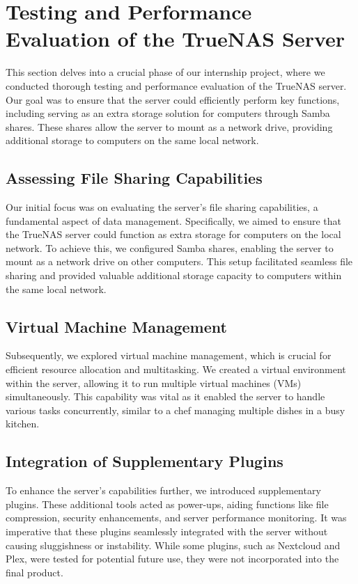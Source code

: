 \section{Testing and Performance Evaluation of the TrueNAS Server}

This section delves into a crucial phase of our internship project, where we conducted thorough testing and performance evaluation of the TrueNAS server. Our goal was to ensure that the server could efficiently perform key functions, including serving as an extra storage solution for computers through Samba shares. These shares allow the server to mount as a network drive, providing additional storage to computers on the same local network.

\subsection{Assessing File Sharing Capabilities}

Our initial focus was on evaluating the server's file sharing capabilities, a fundamental aspect of data management. Specifically, we aimed to ensure that the TrueNAS server could function as extra storage for computers on the local network. To achieve this, we configured Samba shares, enabling the server to mount as a network drive on other computers. This setup facilitated seamless file sharing and provided valuable additional storage capacity to computers within the same local network.

\subsection{Virtual Machine Management}

Subsequently, we explored virtual machine management, which is crucial for efficient resource allocation and multitasking. We created a virtual environment within the server, allowing it to run multiple virtual machines (VMs) simultaneously. This capability was vital as it enabled the server to handle various tasks concurrently, similar to a chef managing multiple dishes in a busy kitchen.

\subsection{Integration of Supplementary Plugins}

To enhance the server's capabilities further, we introduced supplementary plugins. These additional tools acted as power-ups, aiding functions like file compression, security enhancements, and server performance monitoring. It was imperative that these plugins seamlessly integrated with the server without causing sluggishness or instability. While some plugins, such as Nextcloud and Plex, were tested for potential future use, they were not incorporated into the final product.

